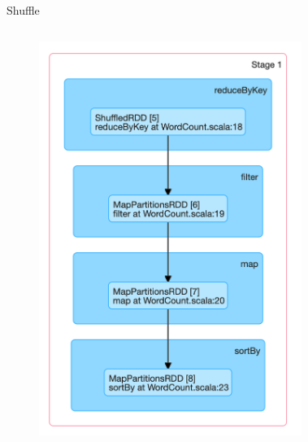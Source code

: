\begin{frame}[plain,t]{Shuffle} %
	 \\  \vspace{2ex}
	\begin{columns}[c]  %
		\column{4cm}  %
		\begin{figure}
			\centering
			\includegraphics[width=1\linewidth]{images/p008}
		\end{figure}
		\column{4cm}  %
		\begin{figure}
			\centering

\end{figure}
\end{columns}
\end{frame}
